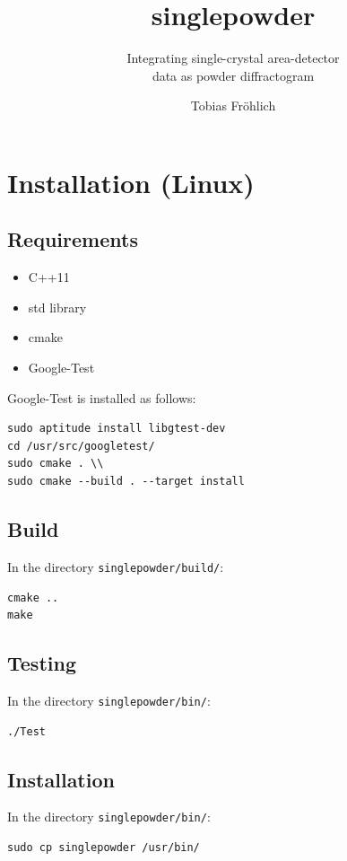 \documentclass[a4paper, 12pt, twoside]{scrartcl}
\title{singlepowder}
\subtitle{Integrating single-crystal area-detector\\data as powder diffractogram}
\author{Tobias Fr\"{o}hlich}
\date{}
\begin{document}
\maketitle

\section{Installation (Linux)}


\subsection{Requirements}

\begin{itemize}
	\item C++11
	\item std library
	\item cmake
	\item Google-Test
\end{itemize}

Google-Test is installed as follows:

\begin{verbatim}
sudo aptitude install libgtest-dev
cd /usr/src/googletest/
sudo cmake . \\
sudo cmake --build . --target install
\end{verbatim}

\subsection{Build}
In the directory \verb|singlepowder/build/|:\\
\begin{verbatim}
cmake ..
make
\end{verbatim}

\subsection{Testing}
In the directory \verb|singlepowder/bin/|:\\
\begin{verbatim}
./Test
\end{verbatim}

\subsection{Installation}
In the directory \verb|singlepowder/bin/|:\\
\begin{verbatim}
sudo cp singlepowder /usr/bin/
\end{verbatim}
\end{document}

